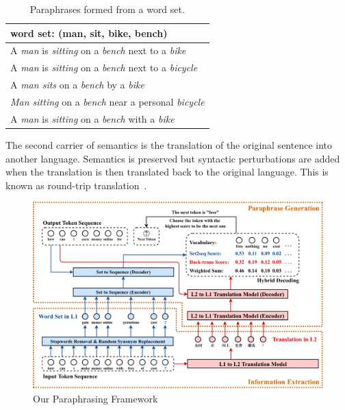 \begin{table}[th]
\small
\centering
\begin{tabular}{l}
\hline 
word set: \textbf{(man, sit, bike, bench)} \\
\hline
A \textit{\color{red}man} is \textit{\color{red}sitting} on a \textit{\color{red}bench} next to a \textit{\color{red}bike} \\
A \textit{\color{red}man} is \textit{\color{red}sitting} on a \textit{\color{red}bench} next to a \textit{\color{red}bicycle} \\
A \textit{\color{red}man sits} on a \textit{\color{red}bench} by a \textit{\color{red}bike} \\
\textit{\color{red}Man sitting} on a \textit{\color{red}bench} near a personal \textit{\color{red}bicycle} \\
A \textit{\color{red}man} is \textit{\color{red}sitting} on a \textit{\color{red}bench} with a \textit{\color{red}bike} \\
\hline
\end{tabular}
\caption{\label{para-example} Paraphrases formed
from a word set.} 
\end{table}


The second carrier of semantics is the translation of the 
original sentence into another language. 
Semantics is preserved but syntactic perturbations are added 
when the translation is then translated back to the 
original language. This is known as round-trip translation~\cite{wieting2017paranmt}. 


\begin{figure}[h]
\centering
\includegraphics[width=1.6\columnwidth]{Paraphrase.pdf}
\caption{Our Paraphrasing Framework}
\label{fig:app}
\end{figure}
 
